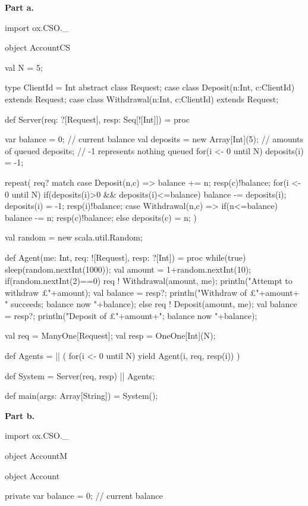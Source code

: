 
\begin{answer}
\Footnotesize
{\bf Part a.}
%
\begin{scala}
import ox.CSO._

object AccountCS{
  val N = 5;

  type ClientId = Int
  abstract class Request;
  case class Deposit(n:Int, c:ClientId) extends Request;
  case class Withdrawal(n:Int, c:ClientId) extends Request;

  def Server(req: ?[Request], resp: Seq[![Int]]) = proc{
    var balance = 0; // current balance
    val deposits = new Array[Int](5); 
      // amounts of queued deposits; 
      // -1 represents nothing queued
    for(i <- 0 until N) deposits(i) = -1; 
 
    repeat(
      req? match {
	case Deposit(n,c) => {
	  balance += n;
	  resp(c)!balance;
	  for(i <- 0 until N)
	    if(deposits(i)>0 && deposits(i)<=balance){
	      balance -= deposits(i); deposits(i) = -1; 
	      resp(i)!balance;
	    }
	}
	case Withdrawal(n,c) => 
	  if(n<=balance){ balance -= n; resp(c)!balance; }
	  else deposits(c) = n;
      }
    )
  }
	    
  val random = new scala.util.Random;

  def Agent(me: Int, req: ![Request], resp: ?[Int]) = proc{
    while(true){
      sleep(random.nextInt(1000));
      val amount = 1+random.nextInt(10); 
      if(random.nextInt(2)==0){
	req ! Withdrawal(amount, me);
	println("Attempt to withdraw £"+amount);
	val balance = resp?;
	println("Withdraw of £"+amount+
		" succeeds; balance now "+balance);
      }
      else{
	req ! Deposit(amount, me);
	val balance = resp?;
	println("Deposit of £"+amount+"; balance now "+balance);
      }
    }
  }

  val req = ManyOne[Request];
  val resp = OneOne[Int](N);


  def Agents =
    || ( for(i <- 0 until N) yield Agent(i, req, resp(i)) )

  def System = Server(req, resp) || Agents;

  def main(args: Array[String]) = System();
}
\end{scala}


\noindent
{\bf Part b.}
%
\begin{scala}
import ox.CSO._

object AccountM{
  object Account{
    private var balance = 0; // current balance

}}
\end{scala}
\end{answer}
